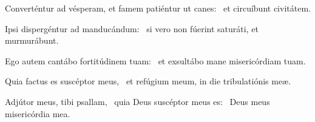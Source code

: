 \item Converténtur ad vésperam, et famem patiéntur ut canes:~\psstar{} et circuíbunt civitátem.

\item Ipsi dispergéntur ad mandu\-cándum:~\psstar{} si vero non fúerint saturáti, et murmurábunt.

\item Ego autem cantábo fortitúdinem tuam:~\psstar{} et exsultábo mane misericórdiam tuam.

\item Quia factus es suscéptor meus,~\psstar{} et refúgium meum, in die tribulatiónis meæ.

\item Adjútor meus, tibi psallam,~\pscross{} quia Deus suscéptor meus es:~\psstar{} Deus meus misericórdia mea.
